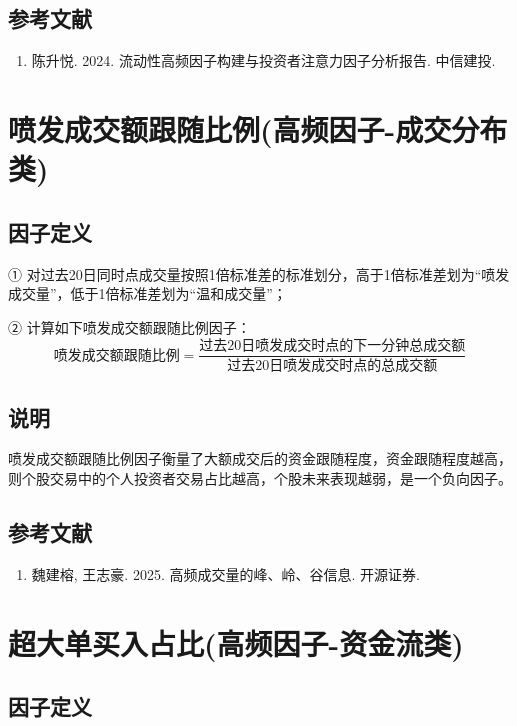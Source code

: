 \documentclass{article}
\begin{document}
\subsection{参考文献}
\begin{enumerate}
    \item 陈升悦. 2024. 流动性高频因子构建与投资者注意力因子分析报告. 中信建投.
\end{enumerate}

\section{喷发成交额跟随比例(高频因子-成交分布类)}

\subsection{因子定义}

① 对过去20日同时点成交量按照1倍标准差的标准划分，高于1倍标准差划为“喷发成交量”，低于1倍标准差划为“温和成交量”；

② 计算如下喷发成交额跟随比例因子：
\begin{equation}
    \text{喷发成交额跟随比例} = \frac{\text{过去20日喷发成交时点的下一分钟总成交额}}{\text{过去20日喷发成交时点的总成交额}}
\end{equation}

\subsection{说明}
喷发成交额跟随比例因子衡量了大额成交后的资金跟随程度，资金跟随程度越高，则个股交易中的个人投资者交易占比越高，个股未来表现越弱，是一个负向因子。

\subsection{参考文献}
\begin{enumerate}
    \item 魏建榕, 王志豪. 2025. 高频成交量的峰、岭、谷信息. 开源证券.
\end{enumerate}

\section{超大单买入占比(高频因子-资金流类)}

\subsection{因子定义}
\end{document}
